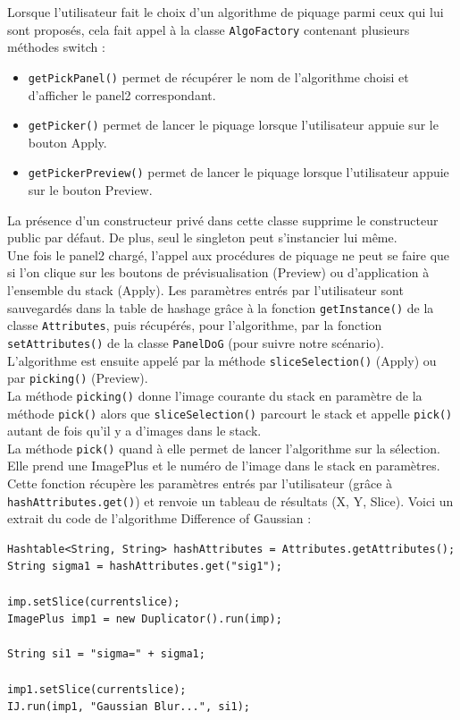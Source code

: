 Lorsque l'utilisateur fait le choix d'un algorithme de piquage parmi ceux qui lui sont proposés, cela fait appel à la classe \texttt{AlgoFactory} contenant plusieurs méthodes switch :
\begin{itemize}
\item \texttt{getPickPanel()} permet de récupérer le nom de l'algorithme choisi et d'afficher le panel2 correspondant.
\item \texttt{getPicker()} permet de lancer le piquage lorsque l'utilisateur appuie sur le bouton Apply.
\item \texttt{getPickerPreview()} permet de lancer le piquage lorsque l'utilisateur appuie sur le bouton Preview.
\end{itemize}

La présence d'un constructeur privé dans cette classe supprime le constructeur public par défaut. De plus, seul le singleton peut s'instancier lui même. \\

Une fois le panel2 chargé, l'appel aux procédures de piquage ne peut se faire que si l'on clique sur les boutons de prévisualisation (Preview) ou d'application à l'ensemble du stack (Apply). Les paramètres entrés par l'utilisateur sont sauvegardés dans la table de hashage grâce à la fonction \texttt{getInstance()} de la classe \texttt{Attributes}, puis récupérés, pour l'algorithme, par la fonction \texttt{setAttributes()} de la classe \texttt{PanelDoG} (pour suivre notre scénario). L'algorithme est ensuite appelé par la méthode \texttt{sliceSelection()} (Apply) ou par \texttt{picking()} (Preview). \\

La méthode \texttt{picking()} donne l'image courante du stack en paramètre de la méthode \texttt{pick()} alors que \texttt{sliceSelection()} parcourt le stack et appelle \texttt{pick()} autant de fois qu'il y a d'images dans le stack. \\

La méthode \texttt{pick()} quand à elle permet de lancer l'algorithme sur la sélection. Elle prend une ImagePlus et le numéro de l'image dans le stack en paramètres. Cette fonction récupère les paramètres entrés par l'utilisateur (grâce à \texttt{hashAttributes.get()}) et renvoie un tableau de résultats (X, Y, Slice). Voici un extrait du code de l'algorithme Difference of Gaussian :

\begin{small}
\begin{lstlisting}
Hashtable<String, String> hashAttributes = Attributes.getAttributes();
String sigma1 = hashAttributes.get("sig1");

imp.setSlice(currentslice);
ImagePlus imp1 = new Duplicator().run(imp);

String si1 = "sigma=" + sigma1;

imp1.setSlice(currentslice);
IJ.run(imp1, "Gaussian Blur...", si1);
\end{lstlisting}
\end{small}


